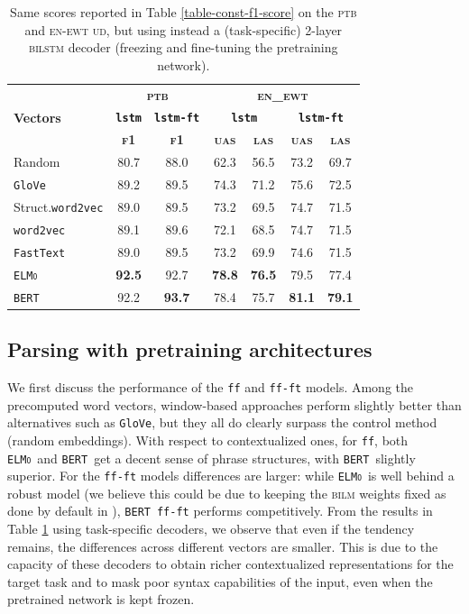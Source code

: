 \documentclass[letterpaper]{article} %
\newcommand{\wordvec}{\texttt{word2vec}}
\newcommand{\fastext}{\texttt{FastText}}
\newcommand{\glove}{\texttt{\textsc{G}lo\textsc{V}e}}
\newcommand{\elmo}{\texttt{\textsc{ELMo}}}
\newcommand{\bert}{\texttt{\textsc{BERT}}}
\begin{document}
\begin{table}[hbtp]
\tabcolsep=0.12cm
\centering
\small{
\begin{tabular}{l|cc|cccc}
\hline
& \multicolumn{2}{c|}{\bf \textsc{ptb}}&\multicolumn{4}{c}{\bf \textsc{en\_ewt}}\\
\bf Vectors & \bf \texttt{lstm} & \bf \texttt{lstm-ft} &\multicolumn{2}{c}{\bf \texttt{lstm}} & \multicolumn{2}{c}{\bf \texttt{lstm-ft}} \\
&\bf \textsc{f1}&\bf \textsc{f1}&\bf \textsc{uas} & \bf \textsc{las} & \bf \textsc{uas} & \bf \textsc{las}  \\
\hline
Random&80.7&88.0&62.3&56.5&73.2&69.7\\
\glove&89.2&89.5&74.3&71.2&75.6&72.5\\
Struct.\wordvec&89.0&89.5&73.2&69.5&74.7&71.5\\
\wordvec&89.1&89.6&72.1&68.5&74.7&71.5\\
\fastext&89.0&89.5&73.2&69.9&74.6&71.5\\
\elmo&\bf 92.5&92.7&\bf 78.8&\bf 76.5&79.5&77.4\\
\bert&92.2&\bf 93.7&78.4&75.7&\bf 81.1&\bf 79.1\\
\hline
\end{tabular}
}
\caption{Same scores reported in Table \ref{table-const-f1-score} on the \textsc{ptb} and \textsc{en-ewt ud}, but using instead a (task-specific) 2-layer \textsc{bilstm} decoder (freezing and fine-tuning the pretraining network).}\label{table-lstm-results}
\end{table}


\subsection{Parsing with pretraining architectures}

We first discuss the performance of the \texttt{ff} and \texttt{ff-ft} models.
Among the precomputed word vectors, window-based approaches perform slightly better than alternatives such as \glove, but they all do clearly surpass the control method (random embeddings). With respect to contextualized ones, for \texttt{ff}, both \elmo\ and \bert\ get a decent sense of phrase structures, with \bert\ slightly superior.
For the \texttt{ff-ft} models differences are larger: while \elmo\ is well behind a robust model (we believe this could be due to keeping the \textsc{bilm} weights fixed as done by default in \cite{peters2018deep}), \bert\ \texttt{ff-ft} performs competitively. From the results in Table \ref{table-lstm-results} using task-specific decoders, we observe that even if the tendency remains, the differences across different vectors are smaller. This is due to the capacity of these decoders to obtain richer contextualized representations for the target task and to mask poor syntax capabilities of the input, even when the pretrained network is kept frozen.
\end{document}
